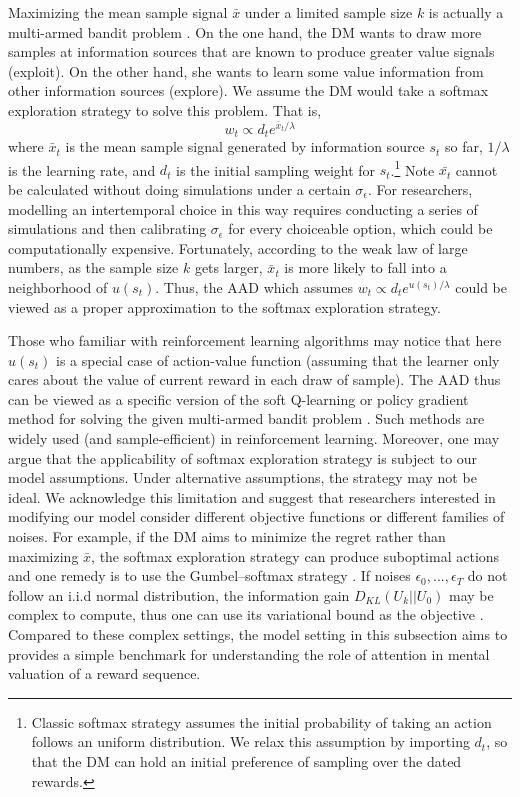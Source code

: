 \documentclass[
  12pt,
]{article}
\begin{document}
Maximizing the mean sample signal \(\bar{x}\) under a limited sample
size \(k\) is actually a multi-armed bandit problem
\citep[][Ch.2]{sutton2018reinforcement}. On the one hand, the DM wants
to draw more samples at information sources that are known to produce
greater value signals (exploit). On the other hand, she wants to learn
some value information from other information sources (explore). We
assume the DM would take a softmax exploration strategy to solve this
problem. That is,\[
w_t \propto d_t e^{\bar{x}_t/\lambda}
\]where \(\bar{x}_t\) is the mean sample signal generated by information
source \(s_t\) so far, \(1/\lambda\) is the learning rate, and \(d_t\)
is the initial sampling weight for \(s_t\).\footnote{Classic softmax
  strategy assumes the initial probability of taking an action follows
  an uniform distribution. We relax this assumption by importing
  \(d_t\), so that the DM can hold an initial preference of sampling
  over the dated rewards.} Note \(\bar{x_t}\) cannot be calculated
without doing simulations under a certain \(\sigma_\epsilon\). For
researchers, modelling an intertemporal choice in this way requires
conducting a series of simulations and then calibrating
\(\sigma_\epsilon\) for every choiceable option, which could be
computationally expensive. Fortunately, according to the weak law of
large numbers, as the sample size \(k\) gets larger, \(\bar{x}_t\) is
more likely to fall into a neighborhood of \(u(s_t)\). Thus, the AAD
which assumes \(w_t \propto d_t e^{u(s_t)/\lambda}\) could be viewed as
a proper approximation to the softmax exploration strategy.

Those who familiar with reinforcement learning algorithms may notice
that here \(u(s_t)\) is a special case of action-value function
(assuming that the learner only cares about the value of current reward
in each draw of sample). The AAD thus can be viewed as a specific
version of the soft Q-learning or policy gradient method for solving the
given multi-armed bandit problem
\citep{haarnoja2017reinforcement, schulman2017equivalence}. Such methods
are widely used (and sample-efficient) in reinforcement learning.
Moreover, one may argue that the applicability of softmax exploration
strategy is subject to our model assumptions. Under alternative
assumptions, the strategy may not be ideal. We acknowledge this
limitation and suggest that researchers interested in modifying our
model consider different objective functions or different families of
noises. For example, if the DM aims to minimize the regret rather than
maximizing \(\bar{x}\), the softmax exploration strategy can produce
suboptimal actions and one remedy is to use the Gumbel--softmax strategy
\citep{cesa2017boltzmann}. If noises \(\epsilon_0,...,\epsilon_T\) do
not follow an i.i.d normal distribution, the information gain
\(D_{KL}(U_k||U_0)\) may be complex to compute, thus one can use its
variational bound as the objective \citep{houthooft2016vime}. Compared
to these complex settings, the model setting in this subsection aims to
provides a simple benchmark for understanding the role of attention in
mental valuation of a reward sequence.
\end{document}
